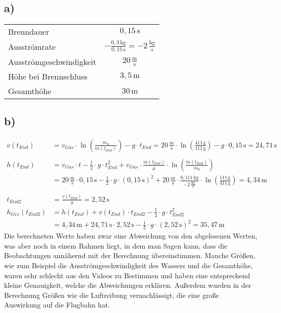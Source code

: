 \documentclass[a4paper,10pt]{extarticle}
\begin{document}
\subsection*{a)}
\begin{tabular}{lc}
Brenndauer & $0,15\,\mathrm{s}$\\
Ausströmrate & $-\frac{0,3\,\mathrm{kg}}{0,15\,\mathrm{s}}=-2\,\frac{\mathrm{kg}}{\mathrm{s}}$\\
Ausströmgeschwindigkeit & $20\,\frac{\mathrm{m}}{\mathrm{s}}$\\
Höhe bei Brennschluss & $3,5\,\mathrm{m}$\\
Gesamthöhe & $30\,\mathrm{m}$\\
\end{tabular}

\subsection*{b)}
\begin{align*}
v\left(t_{End}\right)&=v_{Gas}\cdot\ln\left(\frac{m_0}{m\left(t_{End}\right)}\right)-g\cdot t_{End}=20\,\frac{\mathrm{m}}{\mathrm{s}}\cdot\ln\left(\frac{411\,\mathrm{g}}{111\,\mathrm{g}}\right)-g\cdot0,15\,\mathrm{s}=24,71\,\mathrm{s}\\ \\
h\left(t_{End}\right)&=v_{Gas}\cdot t-\frac{1}{2}\cdot g\cdot t_{End}^2+v_{Gas}\cdot\frac{m\left(t_{End}\right)}{\mu}\cdot\ln\left(\frac{m\left(t_{End}\right)}{m_0}\right)\\
&=20\,\frac{\mathrm{m}}{\mathrm{s}}\cdot 0,15\,\mathrm{s}-\frac{1}{2}\cdot g\cdot \left(0,15\,\mathrm{s}\right)^2+20\,\frac{\mathrm{m}}{\mathrm{s}}\cdot\frac{0,111\,\mathrm{kg}}{-2\,\frac{\mathrm{kg}}{\mathrm{s}}}\cdot\ln\left(\frac{111\,\mathrm{g}}{411\,\mathrm{g}}\right)=4,34\,\mathrm{m}\\ \\
t_{End2}&=\frac{v\left(t_{End}\right)}{g}=2,52\,\mathrm{s}\\
h_{Ges}\left(t_{End2}\right)&=h\left(t_{End}\right)+v\left(t_{End}\right)\cdot t_{End2}-\frac{1}{2}\cdot g\cdot t_{End2}^2\\
&=4,34\,\mathrm{m}+24,71\,\mathrm{s}\cdot 2,52\,\mathrm{s}-\frac{1}{2}\cdot g\cdot\left(2,52\,\mathrm{s}\right)^2=35,47\,\mathrm{m}
\end{align*}
Die berechneten Werte haben zwar eine Abweichung von den abgelesenen Werten, was aber noch in einem Rahmen liegt, in dem man Sagen kann, dass die Beobachtungen annähernd mit der Berechnung übereinstimmen. Manche Größen, wie zum Beispiel die Ausströmgeschwindigkeit des Wassers und die Gesamthöhe, waren sehr schlecht aus den Videos zu Bestimmen und haben eine entsprechend kleine Genauigkeit, welche die Abweichungen erklären. Außerdem wurden in der Berechnung Größen wie die Luftreibung vernachlässigt, die eine große Auswirkung auf die Flugbahn hat.
\end{document}
